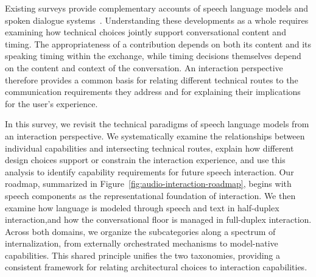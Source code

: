 
Existing surveys provide complementary accounts of speech language models and spoken dialogue systems~\cite{DBLP:conf/acl/CuiYJMZWGK25,DBLP:journals/corr/abs-2411-13577,DBLP:journals/corr/abs-2509-14515,lu2026surveyfullduplexspokendialogue}. Understanding these developments as a whole requires examining how technical choices jointly support conversational content and timing. The appropriateness of a contribution depends on both its content and its speaking timing within the exchange, while timing decisions themselves depend on the content and context of the conversation. An interaction perspective therefore provides a common basis for relating different technical routes to the communication requirements they address and for explaining their implications for the user's experience.


In this survey, we revisit the technical paradigms of speech language models from an interaction perspective. We systematically examine the relationships between individual capabilities and intersecting technical routes, explain how different design choices support or constrain the interaction experience, and use this analysis to identify capability requirements for future speech interaction. 
Our roadmap, summarized in Figure~\ref{fig:audio-interaction-roadmap}, begins with speech components as the representational foundation of interaction. We then examine how language is modeled through speech and text in half-duplex interaction,and how the conversational floor is managed in full-duplex interaction.
Across both domains, we organize the subcategories along a spectrum of internalization, from externally orchestrated mechanisms to model-native capabilities. 
This shared principle unifies the two taxonomies, providing a consistent framework for relating architectural choices to interaction capabilities.


